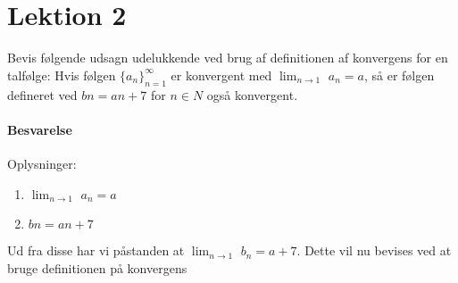\chapter{Lektion 2}
Bevis følgende udsagn udelukkende ved brug af definitionen af konvergens for en talfølge: Hvis følgen $\{a_n\}^\infty_{n=1}$ er konvergent med $\lim_{n\rightarrow1}$ $a_n = a$, så er følgen defineret ved $bn = an + 7$ for $n \in N$ også konvergent.


\subsubsection{Besvarelse}
Oplysninger:
\begin{enumerate}
    \item $\lim_{n\rightarrow1}$ $a_n = a$
    \item $bn = an + 7$
\end{enumerate}
Ud fra disse har vi påstanden at $\lim_{n\rightarrow1}$ $b_n = a+7$. Dette vil nu bevises ved at bruge definitionen på konvergens
\begin{bev} \textbf{} %
\newline

\end{bev}
